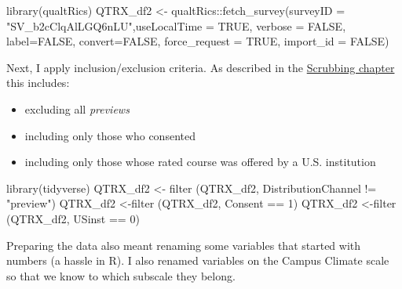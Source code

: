 \documentclass[
  english,
]{book}
\newenvironment{Shaded}{\begin{snugshade}}{\end{snugshade}}
\newcommand{\AttributeTok}[1]{\textcolor[rgb]{0.77,0.63,0.00}{#1}}
\newcommand{\ConstantTok}[1]{\textcolor[rgb]{0.00,0.00,0.00}{#1}}
\newcommand{\DecValTok}[1]{\textcolor[rgb]{0.00,0.00,0.81}{#1}}
\newcommand{\FunctionTok}[1]{\textcolor[rgb]{0.00,0.00,0.00}{#1}}
\newcommand{\NormalTok}[1]{#1}
\newcommand{\OtherTok}[1]{\textcolor[rgb]{0.56,0.35,0.01}{#1}}
\newcommand{\SpecialCharTok}[1]{\textcolor[rgb]{0.00,0.00,0.00}{#1}}
\newcommand{\StringTok}[1]{\textcolor[rgb]{0.31,0.60,0.02}{#1}}
\providecommand{\tightlist}{%
  \setlength{\itemsep}{0pt}\setlength{\parskip}{0pt}}
\begin{document}
\begin{Shaded}
\begin{Highlighting}[]
\FunctionTok{library}\NormalTok{(qualtRics)}
\NormalTok{QTRX\_df2 }\OtherTok{\textless{}{-}}\NormalTok{ qualtRics}\SpecialCharTok{::}\FunctionTok{fetch\_survey}\NormalTok{(}\AttributeTok{surveyID =} \StringTok{"SV\_b2cClqAlLGQ6nLU"}\NormalTok{,}\AttributeTok{useLocalTime =} \ConstantTok{TRUE}\NormalTok{,}
                         \AttributeTok{verbose =} \ConstantTok{FALSE}\NormalTok{, }\AttributeTok{label=}\ConstantTok{FALSE}\NormalTok{, }\AttributeTok{convert=}\ConstantTok{FALSE}\NormalTok{, }\AttributeTok{force\_request =} \ConstantTok{TRUE}\NormalTok{, }\AttributeTok{import\_id =} \ConstantTok{FALSE}\NormalTok{)}
\end{Highlighting}
\end{Shaded}

Next, I apply inclusion/exclusion criteria. As described in the \protect\hyperlink{scrub}{Scrubbing chapter} this includes:

\begin{itemize}
\tightlist
\item
  excluding all \emph{previews}
\item
  including only those who consented
\item
  including only those whose rated course was offered by a U.S. institution
\end{itemize}

\begin{Shaded}
\begin{Highlighting}[]
\FunctionTok{library}\NormalTok{(tidyverse)}
\NormalTok{QTRX\_df2 }\OtherTok{\textless{}{-}} \FunctionTok{filter}\NormalTok{ (QTRX\_df2, DistributionChannel }\SpecialCharTok{!=} \StringTok{"preview"}\NormalTok{)}
\NormalTok{QTRX\_df2 }\OtherTok{\textless{}{-}}\FunctionTok{filter}\NormalTok{ (QTRX\_df2, Consent }\SpecialCharTok{==} \DecValTok{1}\NormalTok{)}
\NormalTok{QTRX\_df2 }\OtherTok{\textless{}{-}}\FunctionTok{filter}\NormalTok{ (QTRX\_df2, USinst }\SpecialCharTok{==} \DecValTok{0}\NormalTok{)}
\end{Highlighting}
\end{Shaded}

Preparing the data also meant renaming some variables that started with numbers (a hassle in R). I also renamed variables on the Campus Climate scale so that we know to which subscale they belong.
\end{document}
